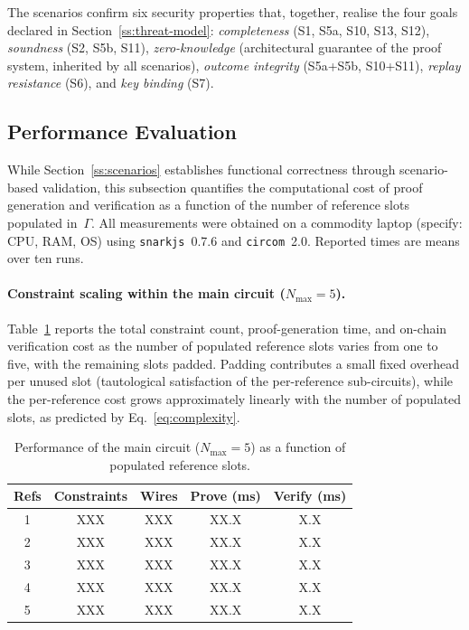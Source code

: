 \documentclass[journal]{IEEEtran}
\begin{document}
\medskip
\noindent
The scenarios confirm six security properties that, together,
realise the four goals declared in
Section~\ref{ss:threat-model}:
\emph{completeness} (S1, S5a, S10, S13, S12),
\emph{soundness} (S2, S5b, S11),
\emph{zero-knowledge} (architectural guarantee of the proof
system, inherited by all scenarios),
\emph{outcome integrity} (S5a+S5b, S10+S11),
\emph{replay resistance} (S6), and
\emph{key binding} (S7).

\subsection{Performance Evaluation}
\label{ss:performance}

While Section~\ref{ss:scenarios} establishes functional correctness
through scenario-based validation, this subsection quantifies the
computational cost of proof generation and verification as a
function of the number of reference slots populated in~$\Gamma$.
All measurements were obtained on a commodity laptop
(specify: CPU, RAM, OS) using \texttt{snarkjs}~0.7.6 and
\texttt{circom}~2.0. Reported times are means over ten runs.

\paragraph{Constraint scaling within the main circuit ($N_{\max} = 5$).}
Table~\ref{tab:perf-main} reports the total constraint count,
proof-generation time, and on-chain verification cost as the number
of populated reference slots varies from one to five, with the
remaining slots padded. Padding contributes a small fixed overhead
per unused slot (tautological satisfaction of the per-reference
sub-circuits), while the per-reference cost grows approximately
linearly with the number of populated slots, as predicted by
Eq.~\ref{eq:complexity}.

\begin{table}[h]
\centering
\caption{Performance of the main circuit ($N_{\max} = 5$) as a
function of populated reference slots.}
\label{tab:perf-main}
\footnotesize
\renewcommand{\arraystretch}{1.1}
\begin{tabular}{c c c c c}
\toprule
\textbf{Refs} & \textbf{Constraints} & \textbf{Wires} &
\textbf{Prove (ms)} & \textbf{Verify (ms)} \\
\midrule
1 & XXX & XXX & XX.X & X.X \\
2 & XXX & XXX & XX.X & X.X \\
3 & XXX & XXX & XX.X & X.X \\
4 & XXX & XXX & XX.X & X.X \\
5 & XXX & XXX & XX.X & X.X \\
\bottomrule
\end{tabular}
\end{table}
\end{document}
